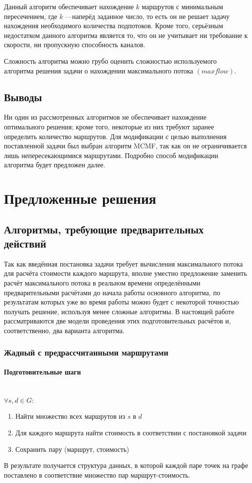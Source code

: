 \documentclass[a4paper]{article}
\begin{document}
Данный алгоритм обеспечивает нахождение $k$ маршрутов с минимальным пересечением, где $k$ ---наперёд заданное число, то есть он не решает задачу нахождения необходимого количества подпотоков. Кроме того, серьёзным недостатком данного алгоритма является то, что он не учитывает ни требование к скорости, ни пропускную способность каналов.

Сложность алгоритма можно грубо оценить сложностью используемого алгоритма решения задачи о нахождении максимального потока $(maxflow)$.

\subsection{Выводы}
Ни один из рассмотренных алгоритмов не обеспечивает нахождение оптимального решения; кроме того, некоторые из них требуют заранее определить количество маршрутов. Для модификации с целью выполнения поставленной задачи был выбран алгоритм MCMF, так как он не ограничивается лишь непересекающимися маршрутами. Подробно способ модификации алгоритма будет предложен далее.

\bigskip
\section{Предложенные решения}
\subsection{Алгоритмы, требующие предварительных действий}
Так как введённая постановка задачи требует вычисления максимального потока для расчёта стоимости каждого маршрута, вполне уместно предложение заменить расчёт максимального потока в реальном времени определёнными предварительными расчётами до начала работы основного алгоритма, по результатам которых уже во время работы можно будет с некоторой точностью получать решение, используя менее сложные алгоритмы. В настоящей работе рассматриваются две модели проведения этих подготовительных расчётов и, соответственно, два варианта алгоритма. 

\subsubsection{Жадный с предрассчитанными маршрутами} 
\paragraph{Подготовительные шаги}\mbox{}\\
$\forall s, d \in G: $
\begin{enumerate}
\item Найти множество всех маршрутов из $s$ в $d$
\item Для каждого маршрута найти стоимость в соответствии с постановкой задачи
\item Сохранить пару (маршрут, стоимость)
\end{enumerate}
В результате получается структура данных, в которой каждой паре точек на графе поставлено в соответствие множество пар маршрут-стоимость.
\end{document}
